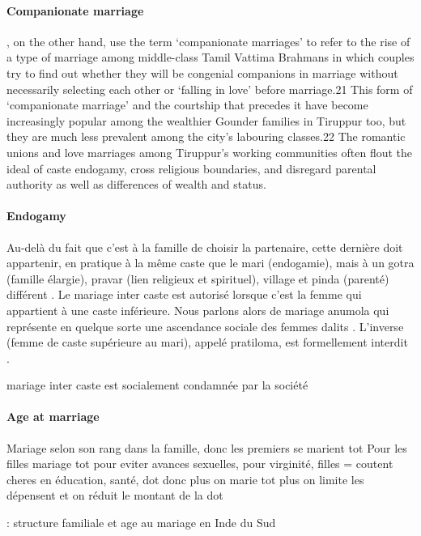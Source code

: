 \documentclass[a4paper, 11pt, onecolumn]{article}
\begin{document}
\paragraph{Companionate marriage}
\cite{Fuller2008}, on the other hand, use the term
‘companionate marriages’ to refer to the rise of a type of marriage
among middle-class Tamil Vattima Brahmans in which couples try
to find out whether they will be congenial companions in marriage
without necessarily selecting each other or ‘falling in love’ before
marriage.21 This form of ‘companionate marriage’ and the courtship
that precedes it have become increasingly popular among the
wealthier Gounder families in Tiruppur too, but they are much less
prevalent among the city’s labouring classes.22 The romantic unions
and love marriages among Tiruppur’s working communities often flout
the ideal of caste endogamy, cross religious boundaries, and disregard
parental authority as well as differences of wealth and status.


\paragraph{Endogamy}
Au-delà du fait que c’est à la famille de choisir la partenaire, cette dernière doit appartenir,
en pratique à la même caste que le mari (endogamie), mais à un gotra (famille élargie), pravar
(lien religieux et spirituel), village et pinda (parenté) différent \cite{Radhakrishnan1937}.
Le mariage inter caste est autorisé lorsque c’est la femme qui appartient à une caste inférieure. Nous parlons alors
de mariage anumola qui représente en quelque sorte une ascendance sociale des femmes dalits \cite{Ahuja2015}. L’inverse (femme de caste supérieure au mari), appelé pratiloma, est formellement interdit \cite{Radhakrishnan1937}.

mariage inter caste est socialement condamnée par la société \citep{James2015}

\paragraph{Age at marriage}
Mariage selon son rang dans la famille, donc les premiers se marient tot \cite{Field2008}
Pour les filles mariage tot pour eviter avances sexuelles, pour virginité, filles = coutent cheres en éducation, santé, dot donc plus on marie tot plus on limite les dépensent et on réduit le montant de la dot \cite{Jensen2003}

\cite{Reddy1991} : structure familiale et age au mariage en Inde du Sud
\end{document}

